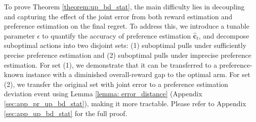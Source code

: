 To prove Theorem \ref{theorem:up_bd_stat}, the main difficulty lies in decoupling and capturing the effect of the joint error from both reward estimation and preference estimation on the final regret. 
To address this, we introduce a tunable parameter $\epsilon$ to quantify the accuracy of preference estimation $\boldsymbol{\hat{c}}_t$, and decompose suboptimal actions into two disjoint sets: 
(1) suboptimal pulls under sufficiently precise preference estimation and (2) suboptimal pulls under imprecise preference estimation.
For set (1), we demonstrate that it can be transferred to a preference-known instance with a diminished overall-reward gap to the optimal arm. For set (2), we transfer the original set with joint error to a preference estimation deviation event using Lemma \ref{lemma: error_distance} (Appendix \ref{sec:app_pr_up_bd_stat}), making it more tractable. 
Please refer to Appendix
\ref{sec:app_up_bd_stat} for the full proof.